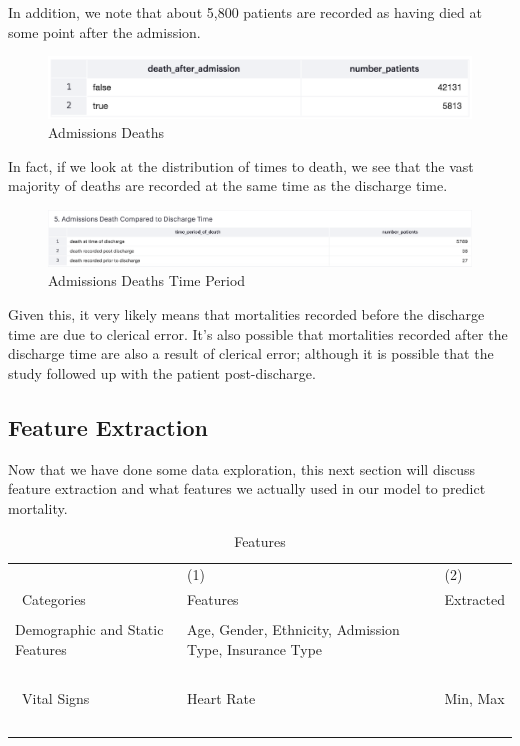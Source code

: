 \documentclass[12pt, final]{article}
\begin{document}
In addition, we note that about 5,800 patients are recorded as having died at some point after the admission.

\begin{figure}[H]
\centering
\caption{Admissions Deaths}
\label{AdmissionsDeaths}
\includegraphics[page = {1}, scale = 0.4]{./images/admissions-deaths.png}
\end{figure}

In fact, if we look at the distribution of times to death, we see that the vast majority of deaths are recorded at the same time as the discharge time.

\begin{figure}[H]
\centering
\caption{Admissions Deaths Time Period}
\label{AdmissionsDeathsTimePeriod}
\includegraphics[page = {1}, scale = 0.4]{./images/admissions-deaths-time-period.png}
\end{figure}

Given this, it very likely means that mortalities recorded before the discharge time are due to clerical error. It's also possible that mortalities recorded after the discharge time are also a result of clerical error; although it is possible that the study followed up with the patient post-discharge.

\subsection{Feature Extraction}
Now that we have done some data exploration, this next section will discuss feature extraction and what features we actually used in our model to predict mortality.

\begin{table}[H]
\footnotesize
{}%
\caption{Features}
\label{Features}
\centering
\begin{tabularx}{\textwidth}{l C C}\hline
 & (1) & (2) \\\
Categories & Features & Extracted \\ \hline
 &  &   \\
Demographic and Static Features & Age, Gender, Ethnicity, Admission Type, Insurance Type &  \\\
\\\
Vital Signs & Heart Rate & Min, Max \\\
\end{tabularx}
\end{table}
\end{document}
